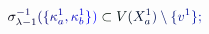 \documentclass[12pt]{article}
\begin{document}
\makeatletter
\renewcommand*{\@textcolor}[3]{%
  \protect\leavevmode
  \begingroup
    \color#1{#2}#3%
  \endgroup
}
\makeatother
\begin{displaymath}
\mathcolor[RGB]{0,0,15}{\sigma} _ { \mathcolor[RGB]{0,0,30}{\lambda} \mathcolor[RGB]{0,0,45}{-} \mathcolor[RGB]{0,0,60}{1} } ^ { \mathcolor[RGB]{0,0,75}{-} \mathcolor[RGB]{0,0,90}{1} } \mathcolor[RGB]{0,0,105}{(} \mathcolor[RGB]{0,0,120}{\{} \mathcolor[RGB]{0,0,135}{\kappa} _ { \mathcolor[RGB]{0,0,150}{a} } ^ { \mathcolor[RGB]{0,0,165}{1} } \mathcolor[RGB]{0,0,180}{,} \mathcolor[RGB]{0,0,195}{\kappa} _ { \mathcolor[RGB]{0,0,210}{b} } ^ { \mathcolor[RGB]{0,0,225}{1} } \mathcolor[RGB]{0,0,240}{\}} \mathcolor[RGB]{0,0,255}{)} \mathcolor[RGB]{0,15,0}{\subset} \mathcolor[RGB]{0,15,15}{V} \mathcolor[RGB]{0,15,30}{(} \mathcolor[RGB]{0,15,45}{X} _ { \mathcolor[RGB]{0,15,60}{a} } ^ { \mathcolor[RGB]{0,15,75}{1} } \mathcolor[RGB]{0,15,90}{)} \mathcolor[RGB]{0,15,105}{\setminus} \mathcolor[RGB]{0,15,120}{\{} \mathcolor[RGB]{0,15,135}{v} ^ { \mathcolor[RGB]{0,15,150}{1} } \mathcolor[RGB]{0,15,165}{\}} \mathcolor[RGB]{0,15,180}{;}
\end{displaymath}
\end{document}
